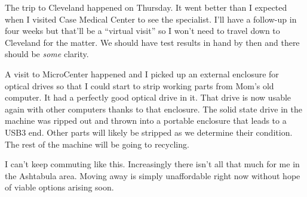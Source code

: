 The trip to Cleveland happened on Thursday. It went better than I
expected when I visited Case Medical Center to see the specialist. I'll
have a follow-up in four weeks but that'll be a ``virtual visit'' so I
won't need to travel down to Cleveland for the matter. We should have
test results in hand by then and there should be \emph{some} clarity.

A visit to MicroCenter happened and I picked up an external enclosure
for optical drives so that I could start to strip working parts from
Mom's old computer. It had a perfectly good optical drive in it. That
drive is now usable again with other computers thanks to that enclosure.
The solid state drive in the machine was ripped out and thrown into a
portable enclosure that leads to a USB3 end. Other parts will likely be
stripped as we determine their condition. The rest of the machine will
be going to recycling.

I can't keep commuting like this. Increasingly there isn't all that much
for me in the Ashtabula area. Moving away is simply unaffordable right
now without hope of viable options arising soon.
